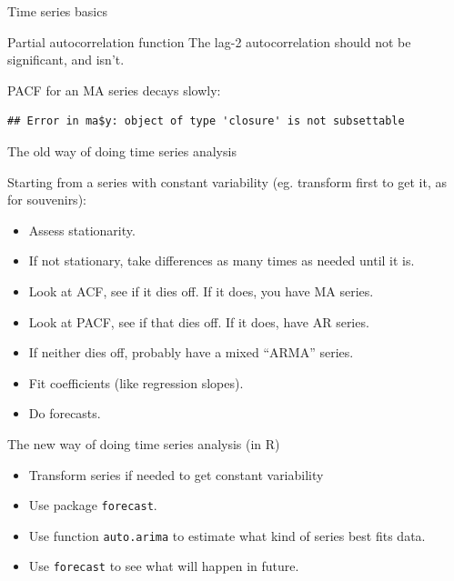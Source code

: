 \documentclass[ignorenonframetext,]{beamer}
\newenvironment{Shaded}{\begin{snugshade}}{\end{snugshade}}
\newcommand{\DataTypeTok}[1]{\textcolor[rgb]{0.13,0.29,0.53}{#1}}
\newcommand{\KeywordTok}[1]{\textcolor[rgb]{0.13,0.29,0.53}{\textbf{#1}}}
\newcommand{\NormalTok}[1]{#1}
\newcommand{\OperatorTok}[1]{\textcolor[rgb]{0.81,0.36,0.00}{\textbf{#1}}}
\newcommand{\StringTok}[1]{\textcolor[rgb]{0.31,0.60,0.02}{#1}}
\providecommand{\tightlist}{%
  \setlength{\itemsep}{0pt}\setlength{\parskip}{0pt}}
\begin{document}
\begin{frame}[fragile]{Time series basics}
\begin{block}{Partial autocorrelation function}
The lag-2 autocorrelation should not be significant, and isn't.

PACF for an MA series decays slowly:

\begin{Shaded}
\end{Shaded}

\begin{verbatim}
## Error in ma$y: object of type 'closure' is not subsettable
\end{verbatim}

\end{block}

\begin{block}{The old way of doing time series analysis}

Starting from a series with constant variability (eg. transform first to
get it, as for souvenirs):

\begin{itemize}
\tightlist
\item
  Assess stationarity.
\item
  If not stationary, take differences as many times as needed until it
  is.
\item
  Look at ACF, see if it dies off. If it does, you have MA series.
\item
  Look at PACF, see if that dies off. If it does, have AR series.
\item
  If neither dies off, probably have a mixed ``ARMA'' series.
\item
  Fit coefficients (like regression slopes).
\item
  Do forecasts.
\end{itemize}

\end{block}

\begin{block}{The new way of doing time series analysis (in R)}

\begin{itemize}
\tightlist
\item
  Transform series if needed to get constant variability
\item
  Use package \texttt{forecast}.
\item
  Use function \texttt{auto.arima} to estimate what kind of series best
  fits data.
\item
  Use \texttt{forecast} to see what will happen in future.
\end{itemize}


\end{block}
\end{frame}
\end{document}
